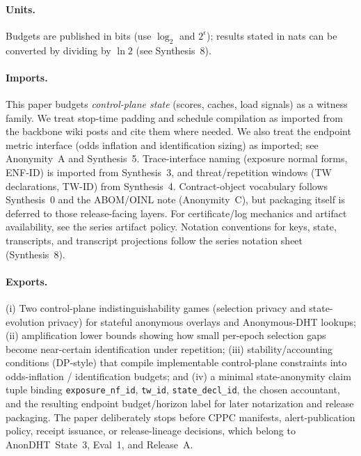\documentclass[11pt]{article}
\begin{document}
\paragraph{Units.} Budgets are published in bits (use $\log_2$ and $2^{\epsilon}$); results stated in nats can be converted by dividing by $\ln 2$ (see Synthesis~8).\cite{series:notation}

\paragraph{Imports.}
This paper budgets \emph{control-plane state} (scores, caches, load signals) as a witness family.
We treat stop-time padding and schedule compilation as imported from the backbone wiki posts and cite them where needed.
We also treat the endpoint metric interface (odds inflation and identification sizing) as imported; see Anonymity~A and Synthesis~5.\cite{series:oddsinflation,series:endpointbridge}
Trace-interface naming (exposure normal forms, ENF-ID) is imported from Synthesis~3, and threat/repetition windows (TW declarations, TW-ID) from Synthesis~4.\cite{series:traceifaces,series:threatwindows}
Contract-object vocabulary follows Synthesis~0 and the ABOM/OINL note (Anonymity~C), but packaging itself is deferred to those release-facing layers.\cite{series:contractobjects,series:abomoinl,series:release}
For certificate/log mechanics and artifact availability, see the series artifact policy.\cite{series:artifactpolicy}
Notation conventions for keys, state, transcripts, and transcript projections follow the series notation sheet (Synthesis~8).\cite{series:notation}


\paragraph{Exports.}
(i) Two control-plane indistinguishability games (selection privacy and state-evolution privacy) for stateful anonymous overlays and Anonymous-DHT lookups;
(ii) amplification lower bounds showing how small per-epoch selection gaps become near-certain identification under repetition;
(iii) stability/accounting conditions (DP-style) that compile implementable control-plane constraints into odds-inflation / identification budgets; and
(iv) a minimal state-anonymity claim tuple binding \texttt{exposure\_nf\_id}, \texttt{tw\_id}, \texttt{state\_decl\_id}, the chosen accountant, and the resulting endpoint budget/horizon label for later notarization and release packaging.\cite{series:contractobjects,series:abomoinl}
The paper deliberately stops before CPPC manifests, alert-publication policy, receipt issuance, or release-lineage decisions, which belong to AnonDHT~State~3, Eval~1, and Release~A.\cite{series:state3,series:evalnotary,series:release}
\end{document}
